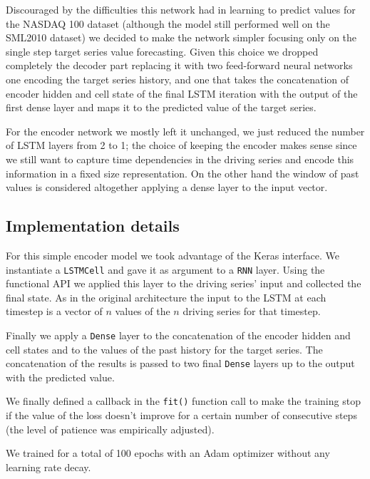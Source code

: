 \documentclass{article}
\begin{document}
Discouraged by the difficulties this network had in learning to predict values 
for the NASDAQ 100 dataset (although the model still performed well on the 
SML2010 dataset) we decided to make the network simpler focusing only on the 
single step target series value forecasting. Given this choice we dropped 
completely the decoder part replacing it with two feed-forward neural networks 
one encoding the target series history, and one that takes the concatenation of 
encoder hidden and cell state of the final LSTM iteration with the output of the 
first dense layer and maps it to the predicted value of the target series.

For the encoder network we mostly left it unchanged, we 
just reduced the number of LSTM layers from 2 to 1; the choice of keeping the 
encoder makes sense since we still want to capture time dependencies in the 
driving series and encode this information in a fixed size representation. On the 
other hand the window of past values is considered altogether applying a dense 
layer to the input vector.


\subsection{Implementation details}

For this simple encoder model we took advantage of the Keras interface.
We instantiate a \texttt{LSTMCell} and gave it as argument to a \texttt{RNN}
layer. Using the functional API we applied this layer to the driving series'
input and collected the final state. As in the original architecture the input
to the LSTM at each timestep is a vector of $n$ values of the $n$ driving
series for that timestep.

Finally we apply a \texttt{Dense} layer to the concatenation of the encoder 
hidden and cell states and to the values of the past history for the target 
series. The concatenation of the results is passed to two final \texttt{Dense} 
layers up to the output with the predicted value.

We finally defined a callback in the \texttt{fit()} function call to make the
training stop if the value of the loss doesn't improve for a certain number of
consecutive steps (the level of patience was empirically adjusted).

We trained for a total of 100 epochs with an Adam optimizer without any learning 
rate decay.
\end{document}
